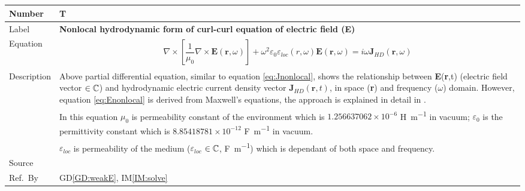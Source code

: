 \documentclass[12pt]{article}
\newcommand{\colBwidth}{0.82\textwidth} \newcommand{\colCwidth}{0.1\textwidth}
\begin{document}
	~\newline
	
	~\newline
	
	\noindent \begin{minipage}{\textwidth} \renewcommand*{\arraystretch}{1.5}
		\begin{tabular}{| p{\colAwidth} | p{\colBwidth}|} \hline \rowcolor[gray]{0.9}
			Number& T{theorynum}\thetheorynum \label{TM:E}\\ \hline Label&\bf
			Nonlocal hydrodynamic form of curl-curl equation of electric field (\textbf{E})
			\\ \hline Equation& \begin{equation} \label{eq:Enonlocal} \begin{gathered}
					\nabla\times[\dfrac{1}{\mu_{0}}\nabla\times \textbf{E}(\textbf{r},\omega)] + \omega^2
					\varepsilon_{0}\varepsilon_{loc}(r,\omega)\textbf{E}(\textbf{r},\omega) = i \omega \textbf{J}_{HD}(\textbf{r}, \omega) \end{gathered}  \end{equation} \\
			
			
			\hline Description & Above partial differential equation, similar to equation
			\ref{eq:Jnonlocal}, shows the relationship between \textbf{E}(\textbf{r},t)
			(electric field vector $\in \Bbb C$) and hydrodynamic electric current density
			vector $\textbf{J}_{HD}(\textbf{r},t)$, in space (\textbf{r}) and frequency ($\omega$) domain. However, equation \ref{eq:Enonlocal}
			is derived from  Maxwell's equations, the approach is explained in detail in
			\cite{hiremath2012numerical}. \\ & In this equation $\mu_{0}$ is permeability
			constant of the environment which is $1.256637062 \times 10^{-6}$ \si{\henry \per \meter} in vacuum;
			$\varepsilon_{0}$ is the permittivity constant which is  $8.85418781 \times 10^{-12}$ 
			\si{\farad \per \meter} in vacuum. \\ &$\varepsilon_{loc}$ is
			permeability of the medium ($\varepsilon_{loc}$ $\in \Bbb C$, \si{\farad \per 
				\meter}) which is dependant of both space and frequency. \\ \hline Source & \cite{hiremath2012numerical} \\ %
			\hline Ref.\ By & GD\ref{GD:weakE}, IM\ref{IM:solve}\\ \hline \end{tabular}
	\end{minipage}\\
	
\end{document}
